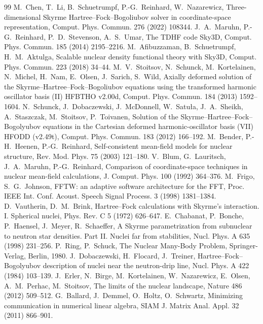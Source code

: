 \documentclass[preprint,12pt]{elsarticle}
\numberwithin{equation}{section}
\begin{document}
\begin{thebibliography}{99}
 M.~Chen, T.~Li, B.~Schuetrumpf, P.-G.~Reinhard, W.~Nazarewicz, Three-dimensional Skyrme Hartree--Fock--Bogoliubov solver in coordinate-space representation, Comput. Phys. Commun. 276 (2022) 108344.
 J.~A.~Maruhn, P.-G.~Reinhard, P.~D.~Stevenson, A.~S.~Umar, The TDHF code Sky3D, Comput. Phys. Commun. 185 (2014) 2195--2216.
 M.~Afibuzzaman, B.~Schuetrumpf, H.~M.~Aktulga, Scalable nuclear density functional theory with Sky3D, Comput. Phys. Commun. 223 (2018) 34--44.
 M.~V.~Stoitsov, N.~Schunck, M.~Kortelainen, N.~Michel, H.~Nam, E.~Olsen, J.~Sarich, S.~Wild, Axially deformed solution of the Skyrme--Hartree--Fock--Bogoliubov equations using the transformed harmonic oscillator basis (II) HFBTHO v2.00d, Comput. Phys. Commun. 184 (2013) 1592--1604.
 N.~Schunck, J.~Dobaczewski, J.~McDonnell, W.~Satu{\l}a, J.~A.~Sheikh, A.~Staszczak, M.~Stoitsov, P.~Toivanen, Solution of the Skyrme--Hartree--Fock--Bogolyubov equations in the Cartesian deformed harmonic-oscillator basis (VII) HFODD (v2.49t), Comput. Phys. Commun. 183 (2012) 166--192.
 M.~Bender, P.-H.~Heenen, P.-G.~Reinhard, Self-consistent mean-field models for nuclear structure, Rev. Mod. Phys. 75 (2003) 121--180.
 V.~Blum, G.~Lauritsch, J.~A.~Maruhn, P.-G.~Reinhard, Comparison of coordinate-space techniques in nuclear mean-field calculations, J. Comput. Phys. 100 (1992) 364--376.
 M.~Frigo, S.~G.~Johnson, FFTW: an adaptive software architecture for the FFT, Proc. IEEE Int. Conf. Acoust. Speech Signal Process. 3 (1998) 1381--1384.
 D.~Vautherin, D.~M.~Brink, Hartree--Fock calculations with Skyrme's interaction. I. Spherical nuclei, Phys. Rev. C 5 (1972) 626--647.
 E.~Chabanat, P.~Bonche, P.~Haensel, J.~Meyer, R.~Schaeffer, A Skyrme parametrization from subnuclear to neutron star densities. Part II. Nuclei far from stabilities, Nucl. Phys. A 635 (1998) 231--256.
 P.~Ring, P.~Schuck, The Nuclear Many-Body Problem, Springer-Verlag, Berlin, 1980.
 J.~Dobaczewski, H.~Flocard, J.~Treiner, Hartree--Fock--Bogolyubov description of nuclei near the neutron-drip line, Nucl. Phys. A 422 (1984) 103--139.
 J.~Erler, N.~Birge, M.~Kortelainen, W.~Nazarewicz, E.~Olsen, A.~M.~Perhac, M.~Stoitsov, The limits of the nuclear landscape, Nature 486 (2012) 509--512.
 G.~Ballard, J.~Demmel, O.~Holtz, O.~Schwartz, Minimizing communication in numerical linear algebra, SIAM J. Matrix Anal. Appl. 32 (2011) 866--901.

\end{thebibliography}
\end{document}
